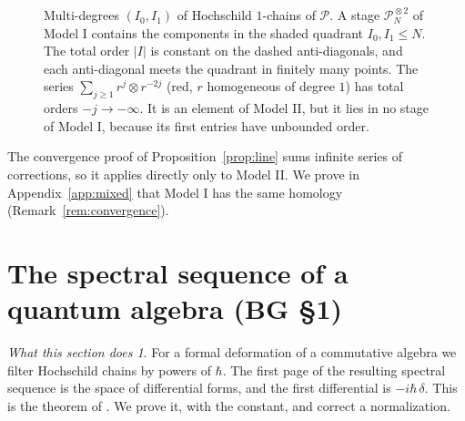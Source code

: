 \documentclass[11pt,oneside,reqno]{article}
\newcommand{\cP}{\mathcal P}
\newcommand{\hot}{\mathbin{\widehat\otimes}}
\newcommand{\hb}{\hbar}
\theoremstyle{plain}
\theoremstyle{definition}
\theoremstyle{remark}
\newtheorem*{whatdoes}{What this section does}
\begin{document}
\begin{figure}[htbp]
\centering
{}
\caption[Two chain models: the lattice of multi-degrees]{Multi-degrees
\((I_0,I_1)\) of Hochschild \(1\)-chains of \(\cP\). A stage
\(\cP_N^{\hot2}\) of Model I contains the components in the shaded quadrant
\(I_0,I_1\le N\). The total order \(|I|\) is constant on the dashed anti-diagonals,
and each anti-diagonal meets the quadrant in finitely many points. The series
\(\sum_{j\ge1}r^j\otimes r^{-2j}\) (red, \(r\) homogeneous of degree \(1\)) has total orders
\(-j\to-\infty\). It is an element of Model II, but it lies in no stage of Model I,
because its first entries have unbounded order.}
\label{fig:lattice}
\end{figure}

The convergence proof of Proposition~\ref{prop:line} sums infinite series of
corrections, so it applies directly only to Model II. We prove in
Appendix~\ref{app:mixed} that Model I has the same homology
(Remark~\ref{rem:convergence}).

\section{The spectral sequence of a quantum algebra (BG \S1)}\label{sec:BG1}

\begin{whatdoes}
For a formal deformation of a commutative algebra we filter Hochschild chains
by powers of \(\hb\). The first page of the resulting spectral sequence is the
space of differential forms, and the first differential is \(-i\hb\,\delta\).
This is the theorem of \cite[\S1]{BG}. We prove it, with the constant, and
correct a normalization.
\end{whatdoes}
\end{document}
